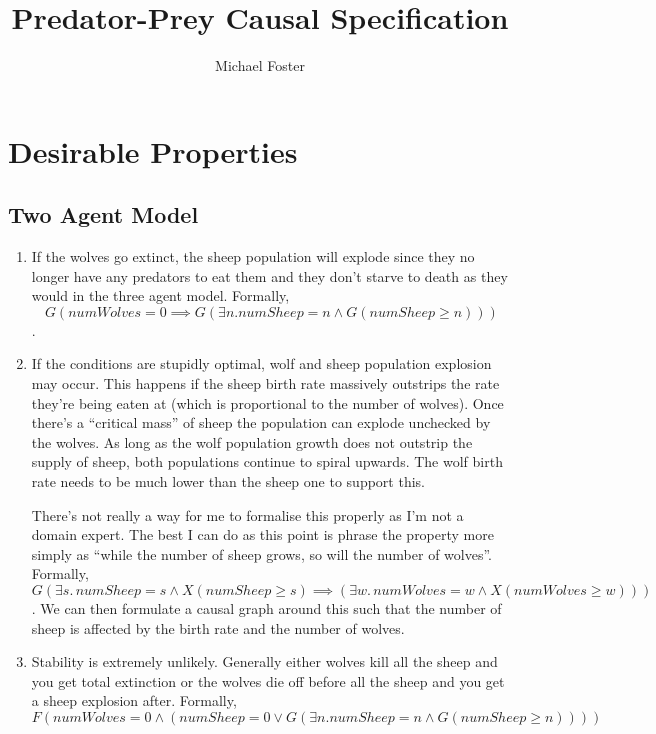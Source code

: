 \documentclass{article}
\title{Predator-Prey Causal Specification}
\author{Michael Foster}
\begin{document}
\maketitle

\section{Desirable Properties}

\subsection{Two Agent Model}
\begin{enumerate}
  \item If the wolves go extinct, the sheep population will explode since they no longer have any predators to eat them and they don't starve to death as they would in the three agent model.
        Formally,
        $$G(numWolves = 0 \implies G(\exists n. numSheep = n \land G(numSheep \geq n)))$$.
  \item If the conditions are stupidly optimal, wolf and sheep population explosion may occur. This happens if the sheep birth rate massively outstrips the rate they're being eaten at (which is proportional to the number of wolves). Once there's a ``critical mass'' of sheep the population can explode unchecked by the wolves. As long as the wolf population growth does not outstrip the supply of sheep, both populations continue to spiral upwards. The wolf birth rate needs to be much lower than the sheep one to support this.

        There's not really a way for me to formalise this properly as I'm not a domain expert. The best I can do as this point is phrase the property more simply as ``while the number of sheep grows, so will the number of wolves''.
        Formally,
        $$G(\exists s.\, numSheep = s \land X(numSheep \ge s) \implies (\exists w.\, numWolves = w \land X(numWolves \ge w)))$$.
        We can then formulate a causal graph around this such that the number of sheep is affected by the birth rate and the number of wolves.
  \item Stability is extremely unlikely. Generally either wolves kill all the sheep and you get total extinction or the wolves die off before all the sheep and you get a sheep explosion after.
        Formally,
        $$F(numWolves = 0 \land (numSheep = 0 \lor G(\exists n. numSheep = n \land G(numSheep \geq n))))$$
\end{enumerate}
\end{document}
